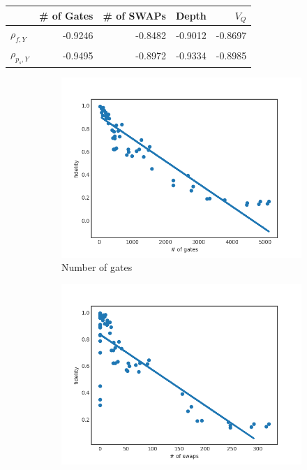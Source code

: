 \documentclass[11pt]{article}
\begin{document}
\begin{center}
\begin{tabular}{lrrrr}
 & \# of Gates & \# of SWAPs & Depth & \(V_Q\)\\
\hline
\(\rho _{f,Y}\) & -0.9246 & -0.8482 & -0.9012 & -0.8697\\
\(\rho _{p_s,Y}\) & -0.9495 & -0.8972 & -0.9334 & -0.8985\\
\hline
\end{tabular}
\end{center}


\begin{figure}[H] 
  \begin{subfigure}[b]{0.5\linewidth}
    \centering
    \includegraphics[width=0.75\linewidth]{f_g_3000_0} 
    \caption{Number of gates} 
    \label{fig:f_g_3000_0} 
    \vspace{4ex}
  \end{subfigure}%
  \begin{subfigure}[b]{0.5\linewidth}
    \centering
    \includegraphics[width=0.75\linewidth]{f_s_3000_0} 

\end{subfigure}
\end{figure}
\end{document}
